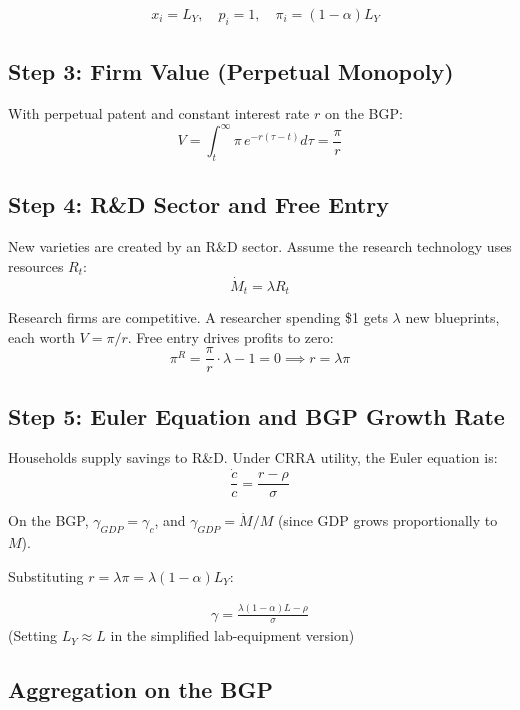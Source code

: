 \documentclass[a4paper,11pt]{article}
\begin{document}
\begin{resultbox}
\begin{align*}
&\boxed{x_i = L_Y, \quad p_i = 1, \quad \pi_i = (1-\alpha)L_Y}
\tag{Monopoly Solution}
\end{align*}
\end{resultbox}

\subsection*{Step 3: Firm Value (Perpetual Monopoly)}

With perpetual patent and constant interest rate $r$ on the BGP:
\[
V = \int_t^\infty \pi \, e^{-r(\tau - t)} d\tau = \frac{\pi}{r}
\]

\subsection*{Step 4: R\&D Sector and Free Entry}

New varieties are created by an R\&D sector. Assume the research technology uses resources $R_t$:
\[
\dot{M}_t = \lambda R_t
\]

Research firms are competitive. A researcher spending \$1 gets $\lambda$ new blueprints, each worth $V = \pi/r$. Free entry drives profits to zero:
\[
\pi^R = \frac{\pi}{r} \cdot \lambda - 1 = 0 \implies \boxed{r = \lambda \pi}
\tag{Free Entry / Interest Rate}
\]

\subsection*{Step 5: Euler Equation and BGP Growth Rate}

Households supply savings to R\&D. Under CRRA utility, the Euler equation is:
\[
\frac{\dot{c}}{c} = \frac{r - \rho}{\sigma}
\]

On the BGP, $\gamma_{GDP} = \gamma_c$, and $\gamma_{GDP} = \dot{M}/M$ (since GDP grows proportionally to $M$).

Substituting $r = \lambda \pi = \lambda(1-\alpha)L_Y$:

\begin{resultbox}
\begin{align*}
\boxed{\gamma = \frac{\lambda(1-\alpha)L - \rho}{\sigma}}
\tag{Romer Market Growth}
\end{align*}
(Setting $L_Y \approx L$ in the simplified lab-equipment version)
\end{resultbox}

\subsection*{Aggregation on the BGP}
\end{document}
